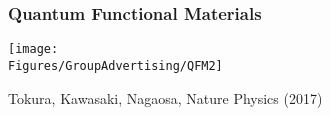 \begin{frame}[label=QFM]
\frametitle{Quantum Functional Materials}
\centerline{\texttt{[image: \\Figures/GroupAdvertising/QFM2]}}


\vspace*{\fill}
\vspace{-1.5em}
\centerline{\makebox[\linewidth]{\rule{0.85\textwidth}{0.4pt}}}
\centerline{\scriptsize Tokura, Kawasaki, Nagaosa, Nature Physics (2017)}

\end{frame}







